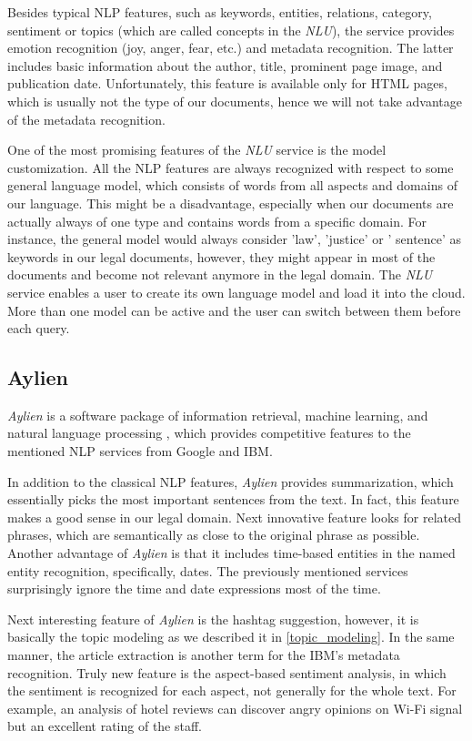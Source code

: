\documentclass[
  digital, %
  table,   %
  lof,     %
  lot,     %
]{fithesis3}
\begin{document}
Besides typical NLP features, such as keywords, entities, relations, category, sentiment or topics (which are called concepts in the \textit{NLU}), the service provides emotion recognition (joy, anger, fear, etc.) and metadata recognition.
The latter includes basic information about the author, title, prominent page image, and publication date.
Unfortunately, this feature is available only for HTML pages, which is usually not the type of our documents, hence we will not take advantage of the metadata recognition.

One of the most promising features of the \textit{NLU} service is the model customization.
All the NLP features are always recognized with respect to some general language model, which consists of words from all aspects and domains of our language.
This might be a disadvantage, especially when our documents are actually always of one type and contains words from a specific domain.
For instance, the general model would always consider 'law', 'justice' or ' sentence' as keywords in our legal documents, however, they might appear in most of the documents and become not relevant anymore in the legal domain.
The \textit{NLU} service enables a user to create its own language model and load it into the cloud.
More than one model can be active and the user can switch between them before each query.

\subsection{Aylien}
\textit{Aylien} is a software package of information retrieval, machine learning, and natural language processing \cite{aylienNLP}, which provides competitive features to the mentioned NLP services from Google and IBM.

In addition to the classical NLP features, \textit{Aylien} provides summarization, which essentially picks the most important sentences from the text. In fact, this feature makes a good sense in our legal domain. Next innovative feature looks for related phrases, which are semantically as close to the original phrase as possible. Another advantage of \textit{Aylien} is that it includes time-based entities in the named entity recognition, specifically, dates. The previously mentioned services surprisingly ignore the time and date expressions most of the time.

Next interesting feature of \textit{Aylien} is the hashtag suggestion, however, it is basically the topic modeling as we described it in \ref{topic_modeling}.
In the same manner, the article extraction is another term for the IBM's metadata recognition.
Truly new feature is the aspect-based sentiment analysis, in which the sentiment is recognized for each aspect, not generally for the whole text.
For example, an analysis of hotel reviews can discover angry opinions on Wi-Fi signal but an excellent rating of the staff.
\end{document}
